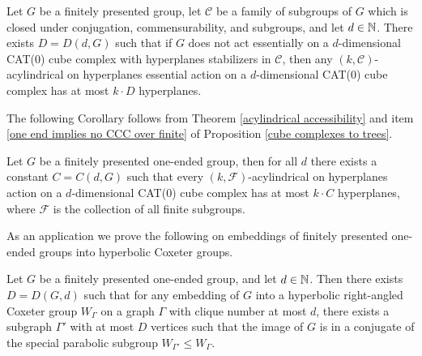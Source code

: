 \begin{theorem}\label{acylindrical accessibility}
	Let $G$ be a finitely presented group, let $\mathcal{C}$ be a family of subgroups of $G$ which is closed under conjugation, commensurability, and subgroups, and let $d\in\mathbb N$. There exists $D=D(d,G)$ such that if $G$ does not act essentially on a $d$-dimensional CAT(0) cube complex with hyperplanes stabilizers in $\mathcal{C}$, then any $(k,\mathcal{C})$-acylindrical on hyperplanes essential action on a $d$-dimensional CAT(0) cube complex has at most $k\cdot D$ hyperplanes.
\end{theorem}


The following Corollary follows from Theorem \ref{acylindrical accessibility} and item \ref{one end implies no CCC over finite} of Proposition \ref{cube complexes to trees}.

\begin{corollary}\label{one ended acyl accessibility}
	Let $G$ be a finitely presented one-ended group, then for all $d$ there exists a constant $C=C(d,G)$ such that every $(k,\mathcal{F})$-acylindrical on hyperplanes action on a $d$-dimensional CAT(0) cube complex has at most $k\cdot C$ hyperplanes, where $\mathcal {F}$ is the collection of all finite subgroups.
\end{corollary}

As an application we prove the following on embeddings of finitely presented one-ended groups into hyperbolic Coxeter groups.

\begin{corollary}
	Let $G$ be a finitely presented one-ended group, and let $d\in\mathbb N$. Then there exists $D=D(G,d)$ such that for any embedding of $G$ into a hyperbolic right-angled Coxeter group $W_\Gamma$ on a graph $\Gamma$ with clique number at most $d$, there exists a subgraph $\Gamma'$ with at most $D$ vertices such that the image of $G$ is in a conjugate of the special parabolic subgroup $W_{\Gamma'}\le W_{\Gamma}$.
\end{corollary}

